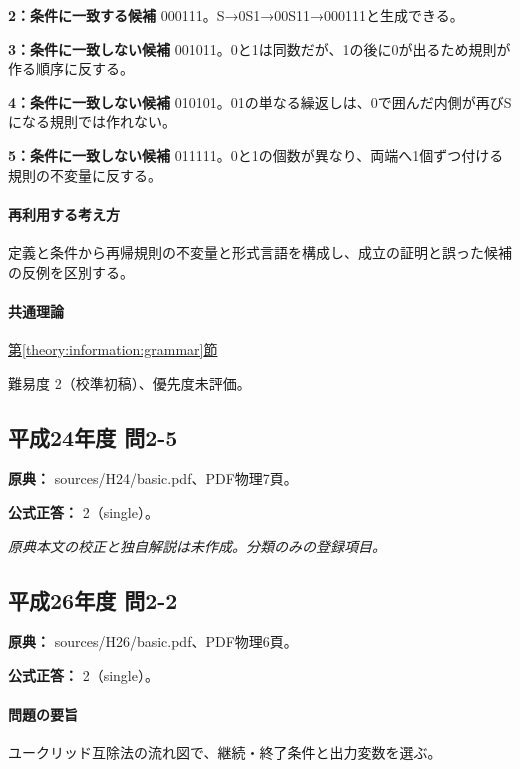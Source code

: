 \noindent\textbf{2：条件に一致する候補} 000111。S→0S1→00S11→000111と生成できる。\par

\noindent\textbf{3：条件に一致しない候補} 001011。0と1は同数だが、1の後に0が出るため規則が作る順序に反する。\par

\noindent\textbf{4：条件に一致しない候補} 010101。01の単なる繰返しは、0で囲んだ内側が再びSになる規則では作れない。\par

\noindent\textbf{5：条件に一致しない候補} 011111。0と1の個数が異なり、両端へ1個ずつ付ける規則の不変量に反する。\par

\paragraph{再利用する考え方} 定義と条件から再帰規則の不変量と形式言語を構成し、成立の証明と誤った候補の反例を区別する。

\paragraph{共通理論} \hyperref[theory:information:grammar]{第\ref*{theory:information:grammar}節}

\par 難易度 2（校準初稿）、優先度未評価。

\subsection{平成24年度 問2-5}
\label{q:h24-reg-basic-2-5}

\noindent\textbf{原典：} sources/H24/basic.pdf、PDF物理7頁。

\textbf{公式正答：} 2（single）。

\par\textit{原典本文の校正と独自解説は未作成。分類のみの登録項目。}

\subsection{平成26年度 問2-2}
\label{q:h26-reg-basic-2-2}

\noindent\textbf{原典：} sources/H26/basic.pdf、PDF物理6頁。

\textbf{公式正答：} 2（single）。

\paragraph{問題の要旨} ユークリッド互除法の流れ図で、継続・終了条件と出力変数を選ぶ。

